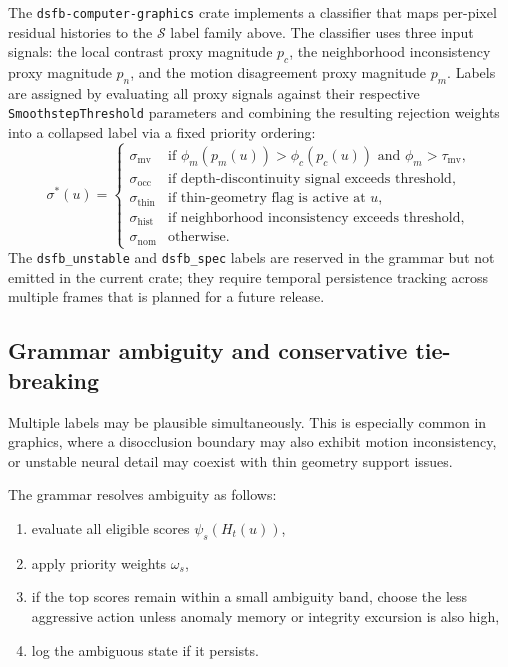 \documentclass[11pt]{article}
\theoremstyle{definition}
\theoremstyle{plain}
\begin{document}
The \texttt{dsfb-computer-graphics} crate implements a classifier that maps per-pixel residual histories to the $\mathcal{S}$ label family above. The classifier uses three input signals: the local contrast proxy magnitude $p_c$, the neighborhood inconsistency proxy magnitude $p_n$, and the motion disagreement proxy magnitude $p_m$. Labels are assigned by evaluating all proxy signals against their respective \texttt{SmoothstepThreshold} parameters and combining the resulting rejection weights into a collapsed label via a fixed priority ordering:
\begin{equation}
\sigma^*(u) = \begin{cases}
  \sigma_{\mathrm{mv}} & \text{if } \phi_m(p_m(u)) > \phi_c(p_c(u)) \text{ and } \phi_m > \tau_{\mathrm{mv}}, \\
  \sigma_{\mathrm{occ}} & \text{if depth-discontinuity signal exceeds threshold}, \\
  \sigma_{\mathrm{thin}} & \text{if thin-geometry flag is active at } u, \\
  \sigma_{\mathrm{hist}} & \text{if neighborhood inconsistency exceeds threshold}, \\
  \sigma_{\mathrm{nom}} & \text{otherwise}.
\end{cases}
\end{equation}
The \texttt{dsfb\_unstable} and \texttt{dsfb\_spec} labels are reserved in the grammar but not emitted in the current crate; they require temporal persistence tracking across multiple frames that is planned for a future release.


\subsection{Grammar ambiguity and conservative tie-breaking}

Multiple labels may be plausible simultaneously. This is especially common in graphics, where a disocclusion boundary may also exhibit motion inconsistency, or unstable neural detail may coexist with thin geometry support issues.

The grammar resolves ambiguity as follows:
\begin{enumerate}[leftmargin=1.5em]
    \item evaluate all eligible scores $\psi_s(H_t(u))$,
    \item apply priority weights $\omega_s$,
    \item if the top scores remain within a small ambiguity band, choose the less aggressive action unless anomaly memory or integrity excursion is also high,
    \item log the ambiguous state if it persists.
\end{enumerate}
\end{document}
